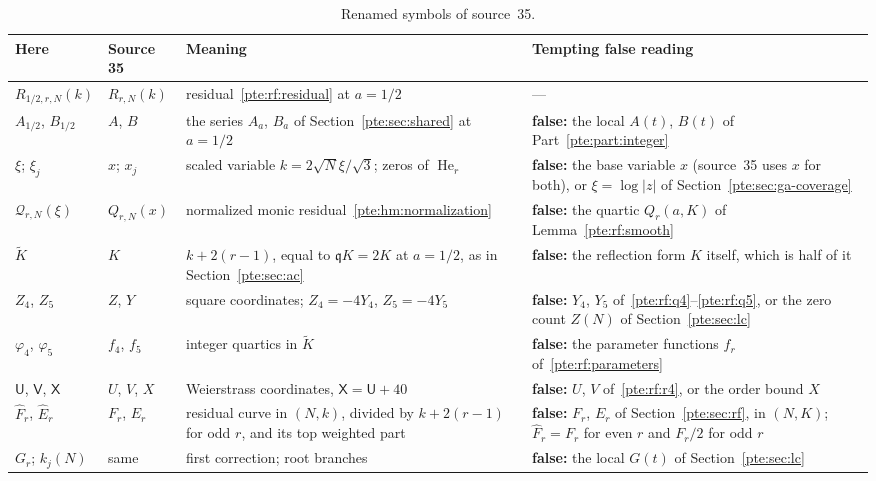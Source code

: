 \documentclass[11pt,a4paper]{article}
\numberwithin{equation}{section}
\theoremstyle{definition}
\theoremstyle{plain}
\newcommand{\fq}{\mathfrak q}
\newcommand{\He}{\operatorname{He}}
\begin{document}
\begin{table}[ht]
\centering\small
\caption{Renamed symbols of source~35.}\label{pte:tab:hmnotation}
\begin{tabular}{@{}>{\raggedright\arraybackslash}p{}>{\raggedright\arraybackslash}p{}>{\raggedright\arraybackslash}p{}>{\raggedright\arraybackslash}p{}@{}}
\toprule
Here & Source 35 & Meaning & Tempting false reading\\
\midrule
$R_{1/2,r,N}(k)$ & $R_{r,N}(k)$ & residual~\eqref{pte:rf:residual} at $a=1/2$ & ---\\
$A_{1/2}$, $B_{1/2}$ & $A$, $B$ & the series $A_a$, $B_a$ of Section~\ref{pte:sec:shared} at $a=1/2$ & \textbf{false:} the local $A(t)$, $B(t)$ of Part~\ref{pte:part:integer}\\
$\xi$; $\xi_j$ & $x$; $x_j$ & scaled variable $k=2\sqrt N\xi/\sqrt3$; zeros of $\He_r$ & \textbf{false:} the base variable $x$ (source~35 uses $x$ for both), or $\xi=\log|z|$ of Section~\ref{pte:sec:ga-coverage}\\
$\mathcal Q_{r,N}(\xi)$ & $Q_{r,N}(x)$ & normalized monic residual~\eqref{pte:hm:normalization} & \textbf{false:} the quartic $Q_r(a,K)$ of Lemma~\ref{pte:rf:smooth}\\
$\widetilde K$ & $K$ & $k+2(r-1)$, equal to $\fq K=2K$ at $a=1/2$, as in Section~\ref{pte:sec:ac} & \textbf{false:} the reflection form $K$ itself, which is half of it\\
$Z_4$, $Z_5$ & $Z$, $Y$ & square coordinates; $Z_4=-4Y_4$, $Z_5=-4Y_5$ & \textbf{false:} $Y_4$, $Y_5$ of~\eqref{pte:rf:q4}--\eqref{pte:rf:q5}, or the zero count $Z(N)$ of Section~\ref{pte:sec:lc}\\
$\varphi_4$, $\varphi_5$ & $f_4$, $f_5$ & integer quartics in $\widetilde K$ & \textbf{false:} the parameter functions $f_r$ of~\eqref{pte:rf:parameters}\\
$\mathsf U$, $\mathsf V$, $\mathsf X$ & $U$, $V$, $X$ & Weierstrass coordinates, $\mathsf X=\mathsf U+40$ & \textbf{false:} $U$, $V$ of~\eqref{pte:rf:r4}, or the order bound $X$\\
$\widehat F_r$, $\widehat E_r$ & $F_r$, $E_r$ & residual curve in $(N,k)$, divided by $k+2(r-1)$ for odd $r$, and its top weighted part & \textbf{false:} $F_r$, $E_r$ of Section~\ref{pte:sec:rf}, in $(N,K)$; $\widehat F_r=F_r$ for even $r$ and $F_r/2$ for odd $r$\\
$G_r$; $k_j(N)$ & same & first correction; root branches & \textbf{false:} the local $G(t)$ of Section~\ref{pte:sec:lc}\\
\bottomrule
\end{tabular}
\end{table}
\end{document}
